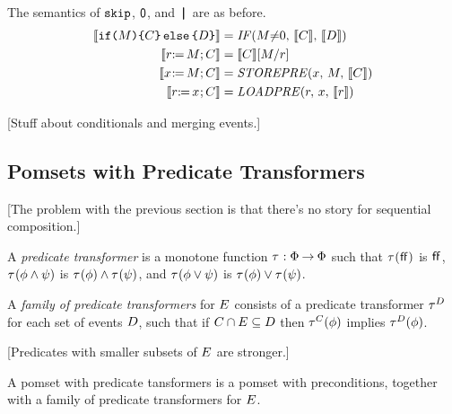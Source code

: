 The semantics of $\SKIP$, $\NIL$, and $\PAR$ are as before.
\begin{align*}
  \sem{\IF{\aExp}\THEN\aCmd\ELSE\bCmd\FI} &= \sIF{\aExp{\neq}0}\sTHEN\sem{\aCmd}\sELSE\sem{\bCmd}\sFI
  \\
  \sem{\LET{\aReg}{\aExp}\SEMI \aCmd} &= \sem{\aCmd}[\aExp/\aReg]
  \\
  \sem{\PW{\aLoc}{\aExp}\SEMI \aCmd} &= \sSTOREPRE{\aLoc}{\aExp}{\sem{\aCmd}}
  \\
  \sem{\PR{\aLoc}{\aReg}\SEMI \aCmd} &= \sLOADPRE{\aReg}{\aLoc}{\sem{\aReg}}
\end{align*}

[Stuff about conditionals and merging events.]


\subsection{Pomsets with Predicate Transformers}

[The problem with the previous section is that there's no story for
sequential composition.]

\begin{definition}
  A \emph{predicate transformer} is a monotone function
  $\aTr:\Formulae\fun\Formulae$ such that
  $\aTr(\FALSE)$ is $\FALSE$,
  $\aTr(\aForm\land\bForm)$ is $\aTr(\aForm)\land\aTr(\bForm)$, and
  $\aTr(\aForm\lor\bForm)$ is $\aTr(\aForm)\lor\aTr(\bForm)$.
\end{definition}

\begin{definition}
  A \emph{family of predicate transformers}
  for $\aEvs$
  consists of a predicate transformer
  $\aTr[\bEvs]$ for each set of events $\bEvs$,
  such that if $\cEvs \cap \aEvs \subseteq \bEvs$
  then $\aTr[\cEvs](\aForm)$ implies $\aTr[\bEvs](\aForm)$.
\end{definition}

[Predicates with smaller subsets of $\aEvs$ are stronger.]

\begin{definition}
  A pomset with predicate tansformers is a pomset with preconditions,
  together with a family of predicate transformers for $\aEvs$.
\end{definition}


